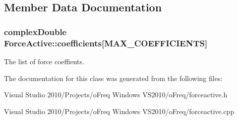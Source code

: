 \subsection{Member Data Documentation}
\hypertarget{class_force_active_ab83eebfa9ec47878caa32da3f8885022}{
\subsubsection[{coefficients}]{\setlength{\rightskip}{0pt plus 5cm}complex\-Double Force\-Active\-::coefficients\mbox{[}M\-A\-X\-\_\-\-C\-O\-E\-F\-F\-I\-C\-I\-E\-N\-T\-S\mbox{]}\hspace{0.3cm}{\ttfamily [protected]}}}\label{class_force_active_ab83eebfa9ec47878caa32da3f8885022}
The list of force coeffients. 

The documentation for this class was generated from the following files\-:\begin{DoxyCompactItemize}
\item 
Visual Studio 2010/\-Projects/o\-Freq Windows V\-S2010/o\-Freq/forceactive.\-h\item 
Visual Studio 2010/\-Projects/o\-Freq Windows V\-S2010/o\-Freq/forceactive.\-cpp\end{DoxyCompactItemize}
